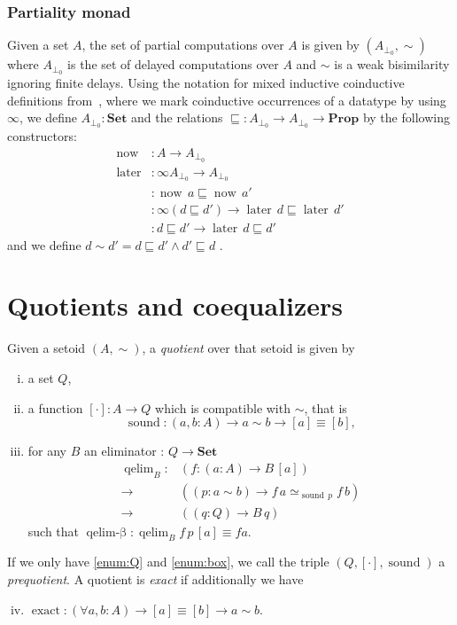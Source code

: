 \documentclass{llncs}
\newcommand{\prop}{\mathbf{Prop}}
\newcommand{\bocks}[1]{[#1]}
\DeclareMathOperator*{\sound}{\mathrm{sound}}
\DeclareMathOperator*{\qelimok}{\mathrm{qelim}-\beta}
\DeclareMathOperator*{\exact}{\mathrm{exact}}
\newcommand{\Set}{\mathbf{Set}}
\DeclareMathOperator*{\now}{\mathrm{now}}
\DeclareMathOperator*{\later}{\mathrm{later}}
\DeclareMathOperator*{\noweq}{\mathrm{now}_\sqsubseteq}
\DeclareMathOperator*{\latereq}{\mathrm{later}_\sqsubseteq}
\DeclareMathOperator*{\laterleft}{\mathrm{later}_{\mathrm{left}}}
\DeclareMathOperator{\elim}{\mathrm{qelim}}
\begin{document}
\subsubsection*{Partiality monad}
Given a set $A$, the set of partial computations over $A$ is given by $(A_{\bot_0},{\sim})$ where $A_{\bot_0}$ is the set of delayed computations over $A$  and $\sim$ is a weak bisimilarity ignoring finite delays. Using the notation for mixed inductive coinductive  definitions from~\cite{danielson:altenkirch:2010}, where we mark coinductive occurrences of a datatype by using $\infty$, we define $A_{\bot_0} : \Set$ and the relations $\sqsubseteq:A_{\bot_0}\to A_{\bot_0} \to \prop$ by the following constructors:
\begin{align*}
\now  &: A \to A_{\bot_0}\\
\later &: \infty A_{\bot_0} \to  A_{\bot_0}\\
\noweq &: \now\, a \sqsubseteq \now\,a'\\
\latereq &: \infty(d \sqsubseteq d') \to \later\,d \sqsubseteq \later\,d'\\
\laterleft &: d\sqsubseteq d' \to \later\,d \sqsubseteq d'
\end{align*}
and we define $d\sim d'= d\sqsubseteq d' \wedge d'\sqsubseteq d$ .

\section{Quotients and coequalizers}\label{sec:quotients}
 
\begin{definition}
\label{def:quotient}
Given a setoid $(A,\sim)$,  a \emph{quotient} over that setoid is given by

\begin{enumerate}[i.]
\item \label{enum:Q} a set $Q$,
\item \label{enum:box}a function $\bocks\cdot\colon A \to Q$ which is compatible with $\sim$, 
that is \[\sound\colon (a,b : A) \to a\sim b \to [a] \equiv [b],\]
\item \label{enum:elim}   for any $B$ an eliminator : $Q\to\Set$
 \begin{align*}
 \elim_B\colon &(f\colon (a:A) \to B\,\bocks a) \\
        {\to}\, &((p:a\sim b) \to f\,a \simeq_{\sound\,p}f\,b)\\
        {\to}\, &((q:Q) \to B\,q)
 \end{align*}
such that $\qelimok\colon \elim_B f \,p\,\bocks a\equiv f a$.
 
\end{enumerate}
If we only have \ref{enum:Q} and \ref{enum:box}, we call the triple $(Q,\bocks\cdot, \sound)$ a \emph{prequotient}.
A quotient is \emph{exact} if additionally
we have 
\begin{enumerate}[i.]
\setcounter{enumi}{3}
\item $\exact :(\forall a,b : A) \to  \bocks a \equiv \bocks b \to a \sim b$.

\end{enumerate}
\end{definition}
\end{document}
